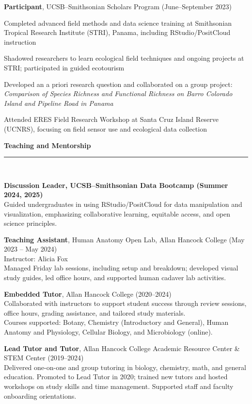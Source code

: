 \documentclass[letterpaper]{article}
\newcommand{\sectionheader}[1]{%
  \noindent\textbf{\Large #1}\\[-1.5ex]
  \noindent\rule{\linewidth}{0.4pt}\\[-1.5ex]
}
\renewenvironment{itemize}{
  \begin{list}{}{
    \setlength{\leftmargin}{1.5em}
  }
}{
  \end{list}
}
\newenvironment{biblist}{%
   \begin{list}{}{%
     \setlength{\labelwidth}{0pt}%
     \setlength{\labelsep}{1em}%
     \setlength{\leftmargin}{2em}%
     \setlength{\itemindent}{-1em}%
   }
}{\end{list}}
\begin{document}
\item \textbf{Participant}, UCSB–Smithsonian Scholars Program (June–September 2023)  
\begin{itemize}
  \item Completed advanced field methods and data science training at Smithsonian Tropical Research Institute (STRI), Panama, including RStudio/PositCloud instruction
  \item Shadowed researchers to learn ecological field techniques and ongoing projects at STRI; participated in guided ecotourism
  \item Developed an a priori research question and collaborated on a group project: \textit{Comparison of Species Richness and Functional Richness on Barro Colorado Island and Pipeline Road in Panama}
  \item Attended ERES Field Research Workshop at Santa Cruz Island Reserve (UCNRS), focusing on field sensor use and ecological data collection
\end{itemize}


\sectionheader{Teaching and Mentorship}

\begin{biblist}

\item \textbf{Discussion Leader, UCSB–Smithsonian Data Bootcamp (Summer 2024, 2025)}\\
Guided undergraduates in using RStudio/PositCloud for data manipulation and visualization, emphasizing collaborative learning, equitable access, and open science principles.

\item \textbf{Teaching Assistant}, Human Anatomy Open Lab, Allan Hancock College (May 2023 – May 2024)\\
Instructor: Alicia Fox\\
Managed Friday lab sessions, including setup and breakdown; developed visual study guides, led office hours, and supported human cadaver lab activities.

\item \textbf{Embedded Tutor}, Allan Hancock College (2020–2024)\\
Collaborated with instructors to support student success through review sessions, office hours, grading assistance, and tailored study materials.\\
Courses supported: Botany, Chemistry (Introductory and General), Human Anatomy and Physiology, Cellular Biology, and Microbiology (online).

\item \textbf{Lead Tutor and Tutor}, Allan Hancock College Academic Resource Center \& STEM Center (2019–2024)\\
Delivered one-on-one and group tutoring in biology, chemistry, math, and general education. Promoted to Lead Tutor in 2020; trained new tutors and hosted workshops on study skills and time management. Supported staff and faculty onboarding orientations.

\end{biblist}
\end{document}
